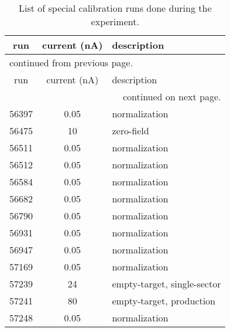 \begin{center}
\begin{singlespacing}
\begin{longtable}{ccl}
\caption[ Special Run List]{\label{tab:data.calibruns}List of special calibration runs done during the  experiment.} \\

\hline
run & current (nA) & description \\
\hline
\endfirsthead

\multicolumn{3}{l}{\scriptsize continued from previous page.} \\
\hline
run & current (nA) & description \\
\hline
\endhead

\hline
\multicolumn{3}{r}{\scriptsize continued on next page.} \\
\endfoot

\hline \hline
\endlastfoot

56397 & 0.05 & normalization \\
56475 & 10 & zero-field \\
56511 & 0.05 & normalization \\
56512 & 0.05 & normalization \\
56584 & 0.05 & normalization \\
56682 & 0.05 & normalization \\
56790 & 0.05 & normalization \\
56931 & 0.05 & normalization \\
56947 & 0.05 & normalization \\
57169 & 0.05 & normalization \\
57239 & 24 & empty-target, single-sector \\
57241 & 80 & empty-target, production \\
57248 & 0.05 & normalization

\end{longtable}
\end{singlespacing}
\end{center}
\vspace{20pt}